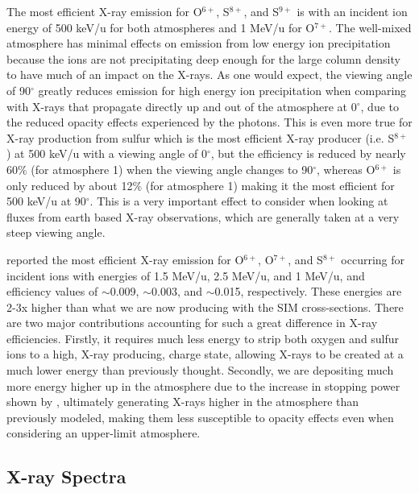 \documentclass[draft]{agujournal2018}
\begin{document}
The most efficient X-ray emission for O$^{6+}$, S$^{8+}$, and S$^{9+}$ is with an incident ion energy of 500 keV/u for both atmospheres and 1 MeV/u for O$^{7+}$.
The well-mixed atmosphere has minimal effects on emission from low energy ion precipitation because the ions are not precipitating deep enough for the large column density to have much of an impact on the X-rays.
As one would expect, the viewing angle of 90$^{\circ}$ greatly reduces emission for high energy ion precipitation when comparing with X-rays that propagate directly up and out of the atmosphere at 0$^{\circ}$, due to the reduced opacity effects experienced by the photons.
This is even more true for X-ray production from sulfur which is the most efficient X-ray producer (i.e. S$^{8+}$) at 500 keV/u with a viewing angle of 0$^{\circ}$, but the efficiency is reduced by nearly 60$\%$ (for atmosphere 1) when the viewing angle changes to 90$^{\circ}$, whereas O$^{6+}$ is only reduced by about 12$\%$ (for atmosphere 1) making it the most efficient for 500 keV/u at 90$^{\circ}$.
This is a very important effect to consider when looking at fluxes from earth based X-ray observations, which are generally taken at a very steep viewing angle.

\citet{ozak2010} reported the most efficient X-ray emission for O$^{6+}$, O$^{7+}$, and S$^{8+}$ occurring for incident ions with energies of 1.5 MeV/u, 2.5 MeV/u, and 1 MeV/u, and efficiency values of $\sim$0.009, $\sim$0.003, and $\sim$0.015, respectively.
These energies are 2-3x higher than what we are now producing with the SIM cross-sections.
There are two major contributions accounting for such a great difference in X-ray efficiencies.
Firstly, it requires much less energy to strip both oxygen and sulfur ions to a high, X-ray producing, charge state, allowing X-rays to be created at a much lower energy than previously thought.
Secondly, we are depositing much more energy higher up in the atmosphere due to the increase in stopping power shown by \citet{schultz2018}, ultimately generating X-rays higher in the atmosphere than previously modeled, making them less susceptible to opacity effects even when considering an upper-limit atmosphere.

\subsection{X-ray Spectra}
\end{document}

